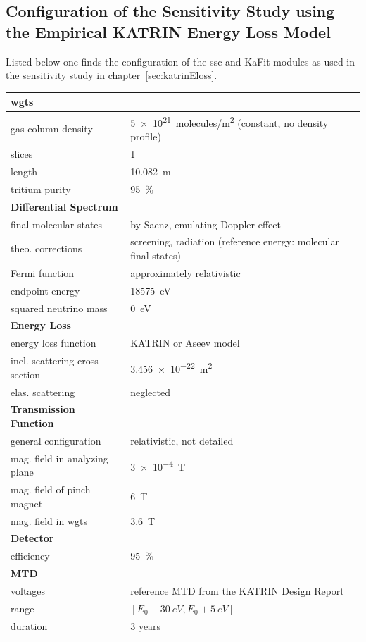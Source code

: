 \begin{samepage}
\section{Configuration of the Sensitivity Study using the Empirical KATRIN Energy Loss Model}
\label{sec:appendixKatrinElossSSCConfig}
Listed below one finds the configuration of the \gls{ssc} and KaFit modules as used in the sensitivity study in chapter~\ref{sec:katrinEloss}.

\newcommand{\myModelConfigTableStrut}{\rule{0pt}{4ex}}
\begin{tabular}{ll}
	\toprule
	\textbf{\gls{wgts}} & \\
	\midrule
	gas column density & \SI{5e21}{molecules/m^2} (constant, no density profile) \\
	slices & 1 \\
	length & \SI{10.082}{m} \\
	tritium purity & \SI{95}{\percent} \\
	\myModelConfigTableStrut
	\textbf{Differential Spectrum} & \\
	\midrule
	final molecular states & by Saenz, emulating Doppler effect \\
	theo. corrections & screening, radiation (reference energy: molecular final states) \\
	Fermi function & approximately relativistic \\
	endpoint energy & \SI{18575}{eV} \\
	squared neutrino mass & \SI{0}{eV} \\
	\myModelConfigTableStrut
	\textbf{Energy Loss} & \\
	\midrule
	energy loss function & KATRIN or Aseev model \\
	inel. scattering cross section & \SI{3.456e-22}{m^2} \\
	elas. scattering & neglected \\
	\myModelConfigTableStrut
	\textbf{Transmission Function} & \\
	\midrule
	general configuration & relativistic, not detailed \\
	mag. field in analyzing plane & \SI{3e-4}{T} \\
	mag. field of pinch magnet & \SI{6}{T} \\
	mag. field in \gls{wgts} & \SI{3.6}{T} \\
	\myModelConfigTableStrut
	\textbf{Detector} & \\
	\midrule
	efficiency & \SI{95}{\percent} \\
	\myModelConfigTableStrut
	\textbf{MTD} & \\
	\midrule
	voltages & reference MTD from the KATRIN Design Report \\
	range & $[E_0-\SI{30}{eV},E_0+\SI{5}{eV}]$ \\
	duration & 3 years \\
	\bottomrule
\end{tabular}
\end{samepage}